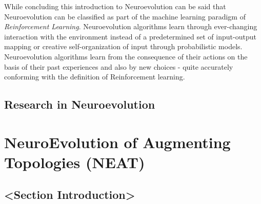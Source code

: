 \documentclass[journal, a4paper]{IEEEtran}
\begin{document}
While concluding this introduction to Neuroevolution can be said that Neuroevolution can be classified as part of the machine learning paradigm of \textit{Reinforcement Learning}. Neuroevolution algorithms learn through ever-changing interaction with the environment instead of a predetermined set of input-output mapping or creative self-organization of input through probabilistic models. Neuroevolution algorithms learn from the consequence of their actions on the basis of their past experiences and also by new choices - quite accurately conforming with the definition of Reinforcement learning.


\subsection{Research in Neuroevolution}

















\section{NeuroEvolution of Augmenting Topologies (NEAT)}

\subsection{<Section Introduction>}
\end{document}
